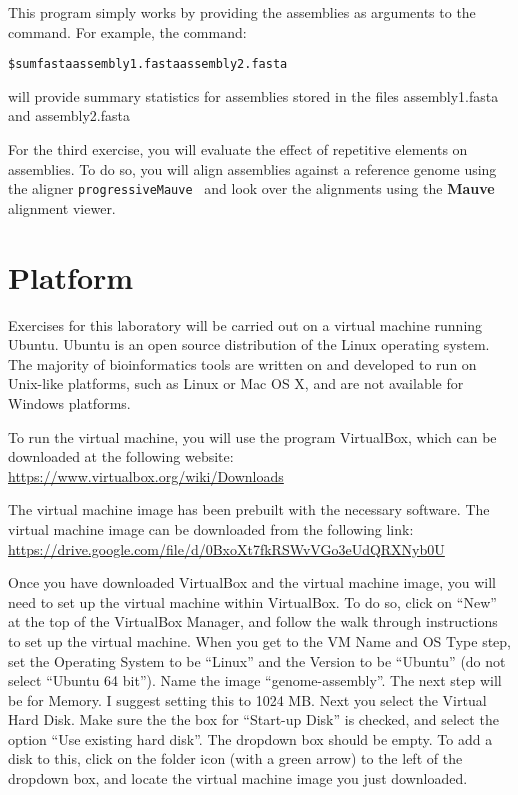 \documentclass[11pt,a4paper]{scrartcl}
\begin{document}
This program simply works by providing the assemblies as arguments to the
command. For example, the command:
\begin{alltt}
    \$ sumfasta assembly1.fasta assembly2.fasta
\end{alltt}
will provide summary statistics for assemblies stored in the files
assembly1.fasta and assembly2.fasta

For the third exercise, you will evaluate the effect of repetitive elements on
assemblies. To do so, you will align assemblies against a reference genome
using the aligner \texttt{progressiveMauve}~\cite{pmauve} and look over the alignments using the
\textbf{Mauve} alignment viewer.

\section*{Platform}
Exercises for this laboratory will be carried out on a virtual machine running
Ubuntu. Ubuntu is an open source distribution of the Linux operating system.
The majority of bioinformatics tools are written on and developed to run on
Unix-like platforms, such as Linux or Mac OS X, and are not available for
Windows platforms. 

To run the virtual machine, you will use the program VirtualBox, which can be
downloaded at the following website: \url{https://www.virtualbox.org/wiki/Downloads}

The virtual machine image has been prebuilt with the necessary software. The
virtual machine image can be downloaded from the following link:
\url{https://drive.google.com/file/d/0BxoXt7fkRSWvVGo3eUdQRXNyb0U}

Once you have downloaded VirtualBox and the virtual machine image, you will
need to set up the virtual machine within VirtualBox. To do so, click on ``New''
at the top of the VirtualBox Manager, and follow the walk through instructions
to set up the virtual machine. When you get to the VM Name and OS Type step,
set the Operating System to be ``Linux'' and the Version to be ``Ubuntu'' (do not
select ``Ubuntu 64 bit''). Name the image ``genome-assembly''. The next step will be
for Memory. I suggest setting this to 1024 MB. Next you select the Virtual Hard
Disk. Make sure the the box for ``Start-up Disk'' is checked, and select the
option “Use existing hard disk”. The dropdown box should be empty. To add a
disk to this, click on the folder icon (with a green arrow) to the left of the
dropdown box, and locate the virtual machine image you just downloaded.
\end{document}
